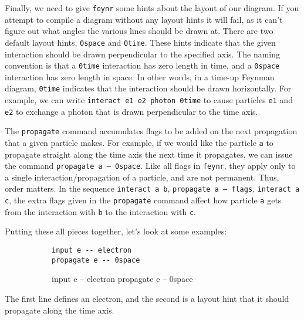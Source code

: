 \documentclass[12pt]{article}
\newcommand{\feynR}{\texttt{feynr}}
\begin{document}
Finally, we need to give \feynR{} some hints about the layout of our diagram.
If you attempt to compile a diagram without any layout hints it will fail, as it can't figure out what angles the various lines should be drawn at.
There are two default layout hints, \texttt{0space} and \texttt{0time}.
These hints indicate that the given interaction should be drawn perpendicular to the specified axis.
The naming convention is that a \texttt{0time} interaction has zero length in time, and a \texttt{0space} interaction has zero length in space.
In other words, in a time-up Feynman diagram, \texttt{0time} indicates that the interaction should be drawn horizontally.
For example, we can write \texttt{interact e1 e2 photon 0time} to cause particles \texttt{e1} and \texttt{e2} to exchange a photon that is drawn perpendicular to the time axis.

The \texttt{propagate} command accumulates flags to be added on the next propagation that a given particle makes.
For example, if we would like the particle \texttt{a} to propagate straight along the time axis the next time it propagates, we can issue the command \texttt{propagate a -- 0space}.
Like all flags in \feynR{}, they apply only to a single interaction/propagation of a particle, and are not permanent.
Thus, order matters.
In the sequence \texttt{interact a b}, \texttt{propagate a -- flags}, \texttt{interact a c}, the extra flags given in the \texttt{propagate} command affect how particle \texttt{a} gets from the interaction with \texttt{b} to the interaction with \texttt{c}.

Putting these all pieces together, let's look at some examples:

\begin{figure}[h!]\begin{subfigure}[h]{0.4\textwidth}\begin{center}
\begin{lstlisting}
input e -- electron
propagate e -- 0space
\end{lstlisting}
\end{center}\end{subfigure}\hfill\vrule\hfill\begin{subfigure}[h]{0.4\textwidth}\begin{center}
\begin{feynr}
input e -- electron
propagate e -- 0space
\end{feynr}
\end{center}\end{subfigure}\end{figure}
The first line defines an electron, and the second is a layout hint that it should propagate along the time axis.
\end{document}
